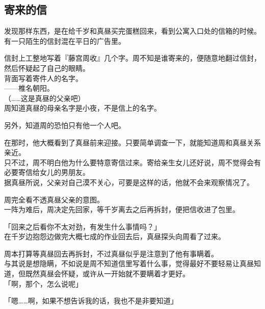 \subsection{寄来的信}

发现那样东西，是在给千岁和真昼买完蛋糕回来，看到公寓入口处的信箱的时候。\\

有一只陌生的信封混在平日的广告里。

信封上工整地写着『藤宫周收』几个字。周不知是谁寄来的，便随意地翻过信封，然后怀疑起了自己的眼睛。\\

背面写着寄件人的名字。\\

——椎名朝阳。\\

（……这是真昼的父亲吧）\\

周知道真昼的母亲名字是小夜，不是信上的名字。

另外，知道周的恐怕只有他一个人吧。

在那时，他大概看到了真昼前来迎接。只要简单调查一下，就能知道周和真昼关系亲近。\\

只不过，周不明白他为什么要特意寄信过来。寄给亲生女儿还好说，周不觉得会有必要寄信给女儿的男朋友。\\

据真昼所说，父亲对自己漠不关心，可要是这样的话，他就不会来观察情况了。

周完全看不透真昼父亲的意图。\\

一阵为难后，周决定先回家，等千岁离去之后再拆封，便把信收进了包里。\\

\vspace{2\baselineskip}

「回来之后看你不太对劲，有发生什么事情吗？」\\

在千岁边抱怨边做完大概七成的作业回去后，真昼探头向周看了过来。

周本打算等真昼回去再拆封，不过真昼似乎是注意到了他有事瞒着。\\

与其说是想隐瞒，不如说是周不知道信里写着什么事，觉得最好不要轻易让真昼知道，但既然真昼会怀疑，或许从一开始就不要瞒着才更好。\\

「啊，那个，怎么说呢」

「嗯……啊，如果不想告诉我的话，我也不是非要知道」\\

